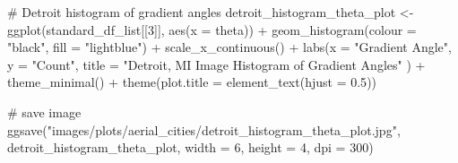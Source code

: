 \documentclass[
  letterpaper,
  DIV=11,
  numbers=noendperiod]{scrreprt}
\newenvironment{Shaded}{\begin{snugshade}}{\end{snugshade}}
\newcommand{\AttributeTok}[1]{\textcolor[rgb]{0.40,0.45,0.13}{#1}}
\newcommand{\CommentTok}[1]{\textcolor[rgb]{0.37,0.37,0.37}{#1}}
\newcommand{\DecValTok}[1]{\textcolor[rgb]{0.68,0.00,0.00}{#1}}
\newcommand{\FloatTok}[1]{\textcolor[rgb]{0.68,0.00,0.00}{#1}}
\newcommand{\FunctionTok}[1]{\textcolor[rgb]{0.28,0.35,0.67}{#1}}
\newcommand{\NormalTok}[1]{\textcolor[rgb]{0.00,0.23,0.31}{#1}}
\newcommand{\OtherTok}[1]{\textcolor[rgb]{0.00,0.23,0.31}{#1}}
\newcommand{\SpecialCharTok}[1]{\textcolor[rgb]{0.37,0.37,0.37}{#1}}
\newcommand{\StringTok}[1]{\textcolor[rgb]{0.13,0.47,0.30}{#1}}
\begin{document}
\begin{Shaded}
\begin{Highlighting}[]
\CommentTok{\# Detroit histogram of gradient angles}
\NormalTok{detroit\_histogram\_theta\_plot }\OtherTok{\textless{}{-}}
  \FunctionTok{ggplot}\NormalTok{(standard\_df\_list[[}\DecValTok{3}\NormalTok{]], }
         \FunctionTok{aes}\NormalTok{(}\AttributeTok{x =}\NormalTok{ theta)) }\SpecialCharTok{+}
  \FunctionTok{geom\_histogram}\NormalTok{(}\AttributeTok{colour =} \StringTok{"black"}\NormalTok{, }\AttributeTok{fill =} \StringTok{"lightblue"}\NormalTok{) }\SpecialCharTok{+}
  \FunctionTok{scale\_x\_continuous}\NormalTok{() }\SpecialCharTok{+} 
  \FunctionTok{labs}\NormalTok{(}\AttributeTok{x =} \StringTok{"Gradient Angle"}\NormalTok{, }
       \AttributeTok{y =} \StringTok{"Count"}\NormalTok{, }
       \AttributeTok{title =} \StringTok{"Detroit, MI Image Histogram of Gradient Angles"}
\NormalTok{       ) }\SpecialCharTok{+}
  \FunctionTok{theme\_minimal}\NormalTok{() }\SpecialCharTok{+}
  \FunctionTok{theme}\NormalTok{(}\AttributeTok{plot.title =} \FunctionTok{element\_text}\NormalTok{(}\AttributeTok{hjust =} \FloatTok{0.5}\NormalTok{))}

\CommentTok{\# save image}
\FunctionTok{ggsave}\NormalTok{(}\StringTok{"images/plots/aerial\_cities/detroit\_histogram\_theta\_plot.jpg"}\NormalTok{, detroit\_histogram\_theta\_plot, }\AttributeTok{width =} \DecValTok{6}\NormalTok{, }\AttributeTok{height =} \DecValTok{4}\NormalTok{, }\AttributeTok{dpi =} \DecValTok{300}\NormalTok{)}
\end{Highlighting}
\end{Shaded}
\end{document}
